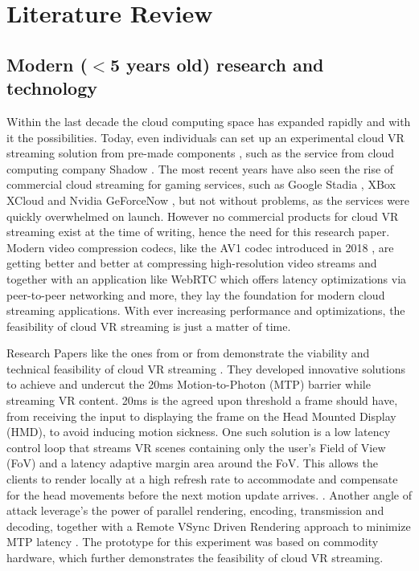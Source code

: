 \section{Literature Review}
\subsection{Modern ($<$5 years old) research and technology}

Within the last decade the cloud computing space has expanded rapidly and with it the possibilities. Today, even individuals can set up an experimental cloud VR streaming solution from pre-made components \parencite{tayoexe}, such as the service from cloud computing company Shadow \parencite{shadow}. The most recent years have also seen the rise of commercial cloud streaming for gaming services, such as Google Stadia \parencite{stadia}, XBox XCloud \parencite{xcloud} and Nvidia GeForceNow \parencite{geforcenow}, but not without problems, as the services were quickly overwhelmed on launch. However no commercial products for cloud VR streaming exist at the time of writing, hence the need for this research paper. Modern video compression codecs, like the AV1 codec introduced in 2018 \parencite{av1}, are getting better and better at compressing high-resolution video streams and together with an application like WebRTC \parencite{webRTC} which offers latency optimizations via peer-to-peer networking and more, they lay the foundation for modern cloud streaming applications. With ever increasing performance and optimizations, the feasibility of cloud VR streaming is just a matter of time.

Research Papers like the ones from \cite{cutcord} or from \cite{mvr} demonstrate the viability and technical feasibility of cloud VR streaming . They developed innovative solutions to achieve and undercut the 20ms Motion-to-Photon (MTP) barrier while streaming VR content. 20ms is the agreed upon threshold a frame should have, from receiving the input to displaying the frame on the Head Mounted Display (HMD), to avoid inducing motion sickness. One such solution is a low latency control loop that streams VR scenes containing only the user’s Field of View (FoV) and a latency adaptive margin area around the FoV. This allows the clients to render locally at a high refresh rate to accommodate and compensate for the head movements before the next motion update arrives. \parencite{mvr}. Another angle of attack  leverage's the power of parallel rendering, encoding, transmission and decoding, together with a Remote VSync Driven Rendering approach to minimize MTP latency \parencite{cutcord}. The prototype for this experiment was based on commodity hardware, which further demonstrates the feasibility of cloud VR streaming.

